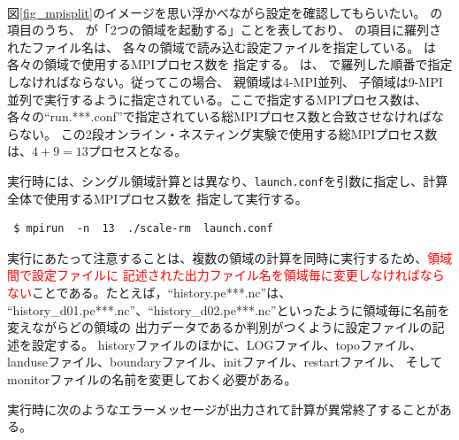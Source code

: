 \\

\noindent 図\ref{fig_mpisplit}のイメージを思い浮かべながら設定を確認してもらいたい。
の項目のうち、
が「2つの領域を起動する」ことを表しており、
の項目に羅列されたファイル名は、
各々の領域で読み込む設定ファイルを指定している。
は各々の領域で使用するMPIプロセス数を
指定する。
は、
で羅列した順番で指定しなければならない。従ってこの場合、
親領域は4-MPI並列、
子領域は9-MPI並列で実行するように指定されている。ここで指定するMPIプロセス数は、
各々の``run.***.conf''で指定されている総MPIプロセス数と合致させなければならない。
この2段オンライン・ネスティング実験で使用する総MPIプロセス数は、$4 + 9 = 13$プロセスとなる。

実行時には、シングル領域計算とは異なり、\verb|launch.conf|を引数に指定し、計算全体で使用するMPIプロセス数を
指定して実行する。
\begin{verbatim}
 $ mpirun  -n  13  ./scale-rm  launch.conf
\end{verbatim}

実行にあたって注意することは、複数の領域の計算を同時に実行するため、\textcolor{red}{領域間で設定ファイルに
記述された出力ファイル名を領域毎に変更しなければならない}ことである。たとえば，``history.pe***.nc''は、
``history\_d01.pe***.nc''、``history\_d02.pe***.nc''といったように領域毎に名前を変えながらどの領域の
出力データであるか判別がつくように設定ファイルの記述を設定する。
historyファイルのほかに、LOGファイル、topoファイル、landuseファイル、boundaryファイル、initファイル、restartファイル、
そしてmonitorファイルの名前を変更しておく必要がある。

実行時に次のようなエラーメッセージが出力されて計算が異常終了することがある。\\

\\

